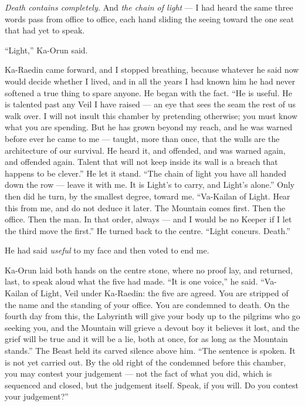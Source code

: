 \emph{Death contains completely.} And \emph{the chain of light} --- I had heard the same three words pass from office to office, each hand sliding the seeing toward the one seat that had yet to speak.\par

``Light,'' Ka-Orun said.\par

Ka-Raedin came forward, and I stopped breathing, because whatever he said now would decide whether I lived, and in all the years I had known him he had never softened a true thing to spare anyone. He began with the fact. ``He is useful. He is talented past any Veil I have raised --- an eye that sees the seam the rest of us walk over. I will not insult this chamber by pretending otherwise; you must know what you are spending. But he has grown beyond my reach, and he was warned before ever he came to me --- taught, more than once, that the walls are the architecture of our survival. He heard it, and offended, and was warned again, and offended again. Talent that will not keep inside its wall is a breach that happens to be clever.'' He let it stand. ``The chain of light you have all handed down the row --- leave it with me. It is Light's to carry, and Light's alone.'' Only then did he turn, by the smallest degree, toward me. ``Va-Kailan of Light. Hear this from me, and do not deduce it later. The Mountain comes first. Then the office. Then the man. In that order, always --- and I would be no Keeper if I let the third move the first.'' He turned back to the centre. ``Light concurs. Death.''\par

He had said \emph{useful} to my face and then voted to end me.\par

Ka-Orun laid both hands on the centre stone, where no proof lay, and returned, last, to speak aloud what the five had made. ``It is one voice,'' he said. ``Va-Kailan of Light, Veil under Ka-Raedin: the five are agreed. You are stripped of the name and the standing of your office. You are condemned to death. On the fourth day from this, the Labyrinth will give your body up to the pilgrims who go seeking you, and the Mountain will grieve a devout boy it believes it lost, and the grief will be true and it will be a lie, both at once, for as long as the Mountain stands.'' The Beast held its carved silence above him. ``The sentence is spoken. It is not yet carried out. By the old right of the condemned before this chamber, you may contest your judgement --- not the fact of what you did, which is sequenced and closed, but the judgement itself. Speak, if you will. Do you contest your judgement?''\par
 
